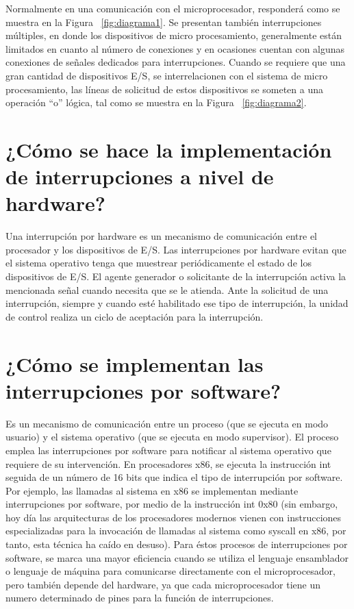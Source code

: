 \documentclass[12pt, letter]{article}
\begin{document}
\setlength{\parindent}{31pt}
Normalmente en una comunicación con el microprocesador, responderá como se muestra  en la Figura ~\ref{fig:diagrama1}. Se presentan también interrupciones múltiples, en donde los dispositivos de micro procesamiento, generalmente están limitados en cuanto al número de conexiones y en ocasiones cuentan con algunas conexiones de señales dedicados para interrupciones. Cuando se requiere que una gran cantidad de dispositivos E/S, se interrelacionen con el sistema de micro procesamiento, las líneas de solicitud de estos dispositivos se someten a una operación “o” lógica, tal como se muestra en la Figura ~\ref{fig:diagrama2}.

\section*{¿Cómo se hace la implementación de interrupciones a nivel de hardware?}

\setlength{\parindent}{31pt}
Una interrupción por hardware es un mecanismo de comunicación entre el procesador y los dispositivos de E/S. Las interrupciones por hardware evitan que el sistema operativo tenga que muestrear periódicamente el estado de los dispositivos de E/S. El agente generador o solicitante de la interrupción activa la mencionada señal cuando necesita que se le atienda. Ante la solicitud de una interrupción, siempre y cuando esté habilitado ese tipo de interrupción, la unidad de control realiza un ciclo de aceptación para la interrupción. 

 \section*{ ¿Cómo se implementan las interrupciones por software?}

\setlength{\parindent}{31pt}
Es un mecanismo de comunicación entre un proceso (que se ejecuta en modo usuario) y el sistema operativo (que se ejecuta en modo supervisor). El proceso emplea las interrupciones por software para notificar al sistema operativo que requiere de su intervención. En procesadores x86, se ejecuta la instrucción int seguida de un número de 16 bits que indica el tipo de interrupción por software. Por ejemplo, las llamadas al sistema en x86 se implementan mediante interrupciones por software, por medio de la instrucción int 0x80 (sin embargo, hoy día las arquitecturas de los procesadores modernos vienen con instrucciones especializadas para la invocación de llamadas al sistema como syscall en x86, por tanto, esta técnica ha caído en desuso).  Para éstos procesos de interrupciones por software, se marca una mayor eficiencia cuando se utiliza el lenguaje ensamblador o lenguaje de máquina para comunicarse directamente con el microprocesador, pero también depende del hardware, ya que cada microprocesador tiene un numero determinado de pines para la función de interrupciones.

\printbibliography[title={Referencias}\nocite{*}]
\end{document}
